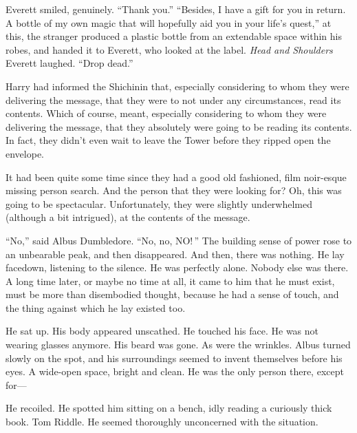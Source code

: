 Everett smiled, genuinely. “Thank you.”
\SmallVSpace
“Besides, I have a gift for you in return. A bottle of my own magic that will hopefully aid you in your life’s quest,” at this, the stranger produced a plastic bottle from an extendable space within his robes, and handed it to Everett, who looked at the label.
\SomeVSpace
\textit{Head and Shoulders}
\SomeVSpace
Everett laughed. “Drop dead.”
\simpleline


Harry had informed the Shichinin that, especially considering to whom they were delivering the message, that they were to not under any circumstances, read its contents. Which of course, meant, especially considering to whom they were delivering the message, that they absolutely were going to be reading its contents. In fact, they didn’t even wait to leave the Tower before they ripped open the envelope.

It had been quite some time since they had a good old fashioned, film noir-esque missing person search. And the person that they were looking for? Oh, this was going to be spectacular. Unfortunately, they were slightly underwhelmed (although a bit intrigued), at the contents of the message.
\begin{writtenNote}
\end{writtenNote}
\simpleline
{}

“No,” said Albus Dumbledore. “No, no, NO! ”
\SmallVSpace
The building sense of power rose to an unbearable peak, and then disappeared.
\SmallVSpace
And then, there was nothing.
\SmallVSpace
He lay facedown, listening to the silence. He was perfectly alone. Nobody else was there. A long time later, or maybe no time at all, it came to him that he must exist, must be more than disembodied thought, because he had a sense of touch, and the thing against which he lay existed too.

He sat up. His body appeared unscathed. He touched his face. He was not wearing glasses anymore. His beard was gone. As were the wrinkles.
\SmallVSpace
Albus turned slowly on the spot, and his surroundings seemed to invent themselves before his eyes. A wide-open space, bright and clean. He was the only person there, except for\mbox{---}

He recoiled. He spotted him sitting on a bench, idly reading a curiously thick book. Tom Riddle. He seemed thoroughly unconcerned with the situation.

